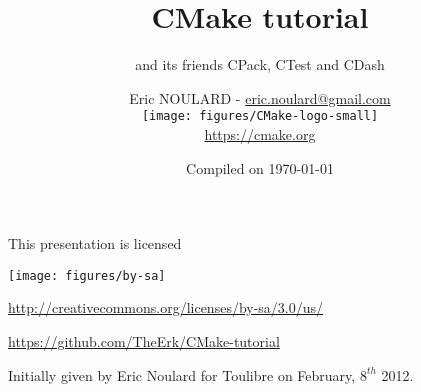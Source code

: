 \documentclass[compress,slidestop,table,usepdftitle=false
              ]
               {beamer}
\begin{document}


\title{CMake tutorial}
\subtitle{and its friends CPack, CTest and CDash}
\author[Eric NOULARD - \url{eric.noulard@gmail.com}]{Eric NOULARD - \url{eric.noulard@gmail.com}\\
        \texttt{[image: figures/CMake-logo-small]}\\
        \url{https://cmake.org}}
\date{Compiled on \today}
\subject{Slides for CMake, CPack, CTest, CDash presentation. In english.}

\begin{frame}
\titlepage
\begin{center}
{\tiny
This presentation is licensed

\texttt{[image: figures/by-sa]}

\url{http://creativecommons.org/licenses/by-sa/3.0/us/}

\url{https://github.com/TheErk/CMake-tutorial}

Initially given by Eric Noulard for Toulibre on February, $8^{th}$ 2012.
}
\end{center}
\end{frame}
\end{document}
